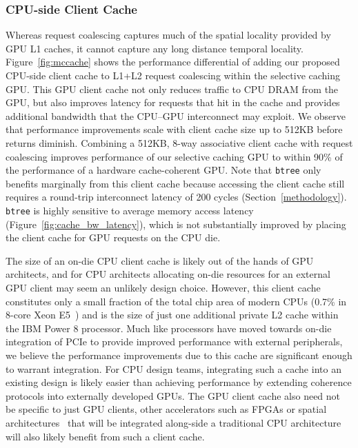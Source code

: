 \subsubsection{CPU-side Client Cache}
\label{mccache}
Whereas request coalescing captures much of the spatial locality provided by GPU L1 caches, it cannot capture
any long distance temporal locality. Figure~\ref{fig:mccache} shows
the performance differential of adding our proposed CPU-side client cache to L1+L2 request coalescing within the selective
caching GPU. This GPU client cache not only reduces traffic to CPU DRAM from the GPU, but also improves latency for requests
that hit in the cache and provides additional bandwidth that the CPU--GPU interconnect may exploit.  We observe
that performance improvements scale with client cache size up to 512KB before returns diminish.  Combining
a 512KB, 8-way associative client cache with request coalescing improves
performance of our selective caching GPU to within 90\% of the performance of a
hardware cache-coherent GPU\@. Note that \texttt{btree} only benefits marginally from
this client cache because accessing the client cache still requires a round-trip interconnect
latency of 200 cycles (Section~\ref{methodology}). \texttt{btree} is highly sensitive to
average memory access latency (Figure~\ref{fig:cache_bw_latency}), which is not substantially improved by
placing the client cache for GPU requests on the CPU die.

The size of an on-die CPU client cache is likely out of the hands of GPU architects, and
for CPU architects allocating on-die resources for an external GPU client may seem an
unlikely design choice.  However, this client cache constitutes only a small fraction of the
total chip area of modern CPUs (0.7\% in 8-core Xeon E5~\cite{XeonLLC2013}) and is the size of just one additional private L2 cache
within the IBM Power 8 processor.  Much like processors have moved towards on-die integration of PCIe to provide improved performance
with external peripherals, we believe the performance improvements due to this cache are significant enough to warrant integration. 
For CPU design teams, integrating such a cache into an existing design is likely easier than achieving performance by extending
coherence protocols into externally developed GPUs. The GPU client cache also need not be specific to just GPU clients,
other accelerators such as FPGAs or spatial architectures~\cite{Putnam2014,Parashar2013} that will be integrated along-side a traditional
CPU architecture will also likely benefit from such a client cache.


